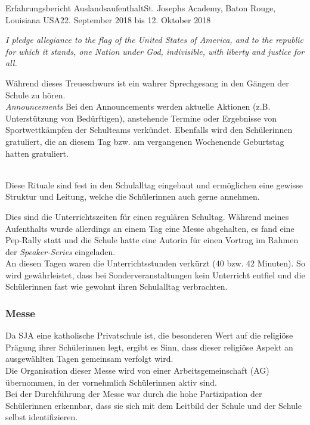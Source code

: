 \documentclass[oneside,openany,headings=optiontotoc,11pt,numbers=noenddot]{article}
\begin{document}
\begin{worksheet}{Erfahrungsbericht Auslandsaufenthalt}{St. Joseph\grq{}s Academy, Baton Rouge, Louisiana USA}{22. September 2018 bis 12. Oktober 2018}
{\begin{center}
\begin{minipage}{0.7\textwidth}
\begin{center}
						\textit{\glqq{}I pledge allegiance to the flag of the United States of America, and to the republic for which it stands, one Nation under God, indivisible, with liberty and justice for all.\grqq{}}
					\end{center}
					\normalsize
				\end{minipage}
			\end{center}	
			Während dieses Treueschwurs ist ein wahrer Sprechgesang in den Gängen der Schule zu hören.\\
			\indent
			\textit{Announcements} Bei den Announcements werden aktuelle Aktionen (z.B. Unterstützung von Bedürftigen), anstehende Termine oder Ergebnisse von Sportwettkämpfen der Schulteams verkündet. Ebenfalls wird den Schülerinnen gratuliert, die an diesem Tag bzw. am vergangenen Wochenende Geburtstag hatten gratuliert.}\\
		Diese Rituale sind fest in den Schulalltag eingebaut und ermöglichen eine gewisse Struktur und Leitung, welche die Schülerinnen auch gerne annehmen.\\
		\normalsize
		\par\noindent
		Dies sind die Unterrichtszeiten für einen regulären Schultag. Während meines Aufenthalts wurde allerdings an einem Tag eine Messe abgehalten, es fand eine Pep-Rally statt und die Schule hatte eine Autorin für einen Vortrag im Rahmen der \textit{Speaker-Series} eingeladen.\\
		An diesen Tagen waren die Unterrichtsstunden verkürzt (40 bzw. 42 Minuten). So  wird gewährleistet, dass bei Sonderveranstaltungen  kein Unterricht entfiel und die Schülerinnen fast wie gewohnt ihren Schulalltag verbrachten.
		\subsubsection*{Messe}
		Da SJA eine katholische Privatschule ist, die besonderen Wert auf die religiöse Prägung ihrer Schülerinnen legt, ergibt es Sinn, dass dieser religiöse Aspekt an ausgewählten Tagen gemeinsam verfolgt wird.\\
		Die Organisation dieser Messe wird von einer Arbeitsgemeinschaft (AG) übernommen, in der vornehmlich Schülerinnen aktiv sind.\\
		Bei der Durchführung der Messe war durch die hohe Partizipation der Schülerinnen erkennbar, dass sie sich mit dem Leitbild der Schule und der Schule selbst identifizieren.

\end{worksheet}
\end{document}
